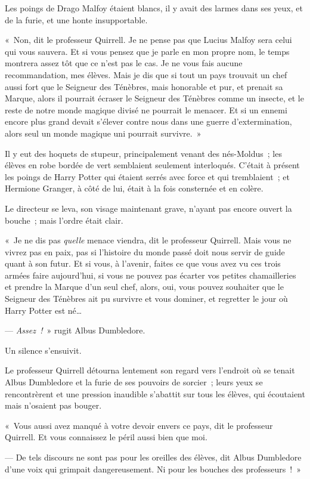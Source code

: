 Les poings de Drago Malfoy étaient blancs, il y avait des larmes dans ses yeux, et de la furie, et une honte insupportable.

«~Non, dit le professeur Quirrell.
Je ne pense pas que Lucius Malfoy sera celui qui vous sauvera.
Et si vous pensez que je parle en mon propre nom, le temps montrera assez tôt que ce n'est pas le cas.
Je ne vous fais aucune recommandation, mes élèves.
Mais je dis que si tout un pays trouvait un chef aussi fort que le Seigneur des Ténèbres, mais honorable et pur, et prenait sa Marque, alors il pourrait écraser le Seigneur des Ténèbres comme un insecte, et le reste de notre monde magique divisé ne pourrait le menacer.
Et si un ennemi encore plus grand devait s'élever contre nous dans une guerre d'extermination, alors seul un monde magique uni pourrait survivre.~»

Il y eut des hoquets de stupeur, principalement venant des nés-Moldus~; les élèves en robe bordée de vert semblaient seulement interloqués.
C'était à présent les poings de Harry Potter qui étaient serrés avec force et qui tremblaient~; et Hermione Granger, à côté de lui, était à la fois consternée et en colère.

Le directeur se leva, son visage maintenant grave, n'ayant pas encore ouvert la bouche~; mais l'ordre était clair.

«~Je ne dis pas \emph{quelle} menace viendra, dit le professeur Quirrell.
Mais vous ne vivrez pas en paix, pas si l'histoire du monde passé doit nous servir de guide quant à son futur.
Et si vous, à l'avenir, faites ce que vous avez vu ces trois armées faire aujourd'hui, si vous ne pouvez pas écarter vos petites chamailleries et prendre la Marque d'un seul chef, alors, oui, vous pouvez souhaiter que le Seigneur des Ténèbres ait pu survivre et vous dominer, et regretter le jour où Harry Potter est né…

--- \emph{Assez~!}~» rugit Albus Dumbledore.

Un silence s'ensuivit.

Le professeur Quirrell détourna lentement son regard vers l'endroit où se tenait Albus Dumbledore et la furie de ses pouvoirs de sorcier~; leurs yeux se rencontrèrent et une pression inaudible s'abattit sur tous les élèves, qui écoutaient mais n'osaient pas bouger.

«~Vous aussi avez manqué à votre devoir envers ce pays, dit le professeur Quirrell.
Et vous connaissez le péril aussi bien que moi.

--- De tels discours ne sont pas pour les oreilles des élèves, dit Albus Dumbledore d'une voix qui grimpait dangereusement.
Ni pour les bouches des professeurs~!~»

